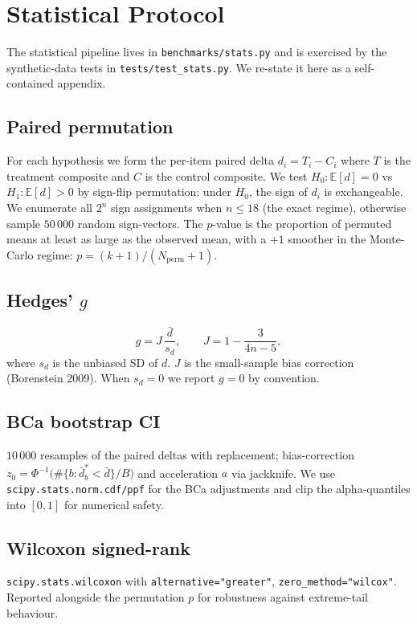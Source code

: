 \section{Statistical Protocol}\label{app:stats}

The statistical pipeline lives in \texttt{benchmarks/stats.py} and is exercised by the synthetic-data tests in \texttt{tests/test\_stats.py}. We re-state it here as a self-contained appendix.

\subsection{Paired permutation}
For each hypothesis we form the per-item paired delta $d_i = T_i - C_i$ where $T$ is the treatment composite and $C$ is the control composite. We test $H_0: \mathbb{E}[d] = 0$ vs $H_1: \mathbb{E}[d] > 0$ by sign-flip permutation: under $H_0$, the sign of $d_i$ is exchangeable. We enumerate all $2^n$ sign assignments when $n \leq 18$ (the exact regime), otherwise sample $50\,000$ random sign-vectors. The $p$-value is the proportion of permuted means at least as large as the observed mean, with a $+1$ smoother in the Monte-Carlo regime: $p = (k+1)/(N_{\text{perm}}+1)$.

\subsection{Hedges' $g$}
\[
g = J\,\frac{\bar d}{s_d},\qquad J = 1 - \frac{3}{4n - 5},
\]
where $s_d$ is the unbiased SD of $d$. $J$ is the small-sample bias correction (Borenstein 2009). When $s_d = 0$ we report $g=0$ by convention.

\subsection{BCa bootstrap CI}
$10\,000$ resamples of the paired deltas with replacement; bias-correction $z_0 = \Phi^{-1}\bigl(\#\{b : \bar d^*_b < \bar d\}/B\bigr)$ and acceleration $a$ via jackknife. We use \texttt{scipy.stats.norm.cdf/ppf} for the BCa adjustments and clip the alpha-quantiles into $[0, 1]$ for numerical safety.

\subsection{Wilcoxon signed-rank}
\texttt{scipy.stats.wilcoxon} with \texttt{alternative="greater"}, \texttt{zero\_method="wilcox"}. Reported alongside the permutation $p$ for robustness against extreme-tail behaviour.

